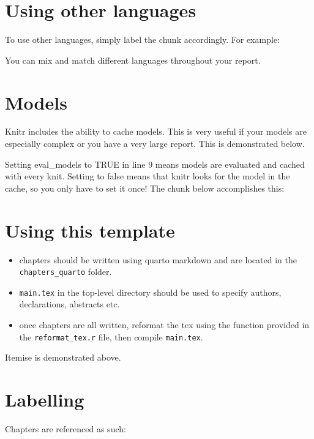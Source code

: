 \documentclass[../main.tex]{subfiles}
\begin{document}
\hypertarget{using-other-languages}{%
\section{Using other languages}\label{using-other-languages}}

To use other languages, simply label the chunk accordingly. For example:

You can mix and match different languages throughout your report.

\hypertarget{models}{%
\section{Models}\label{models}}

Knitr includes the ability to cache models. This is very useful if your
models are especially complex or you have a very large report. This is
demonstrated below.

Setting eval\_models to TRUE in line 9 means models are evaluated and
cached with every knit. Setting to false means that knitr looks for the
model in the cache, so you only have to set it once! The chunk below
accomplishes this:

\hypertarget{using-this-template}{%
\section{Using this template}\label{using-this-template}}

\begin{itemize}
\tightlist
\item
  chapters should be written using quarto markdown and are located in
  the \texttt{chapters\_quarto} folder.
\item
  \texttt{main.tex} in the top-level directory should be used to specify
  authors, declarations, abstracts etc.
\item
  once chapters are all written, reformat the tex using the function
  provided in the \texttt{reformat\_tex.r} file, then compile
  \texttt{main.tex}.
\end{itemize}

Itemise is demonstrated above.

\hypertarget{labelling}{%
\section{Labelling}\label{labelling}}

Chapters are referenced as such:
\end{document}
